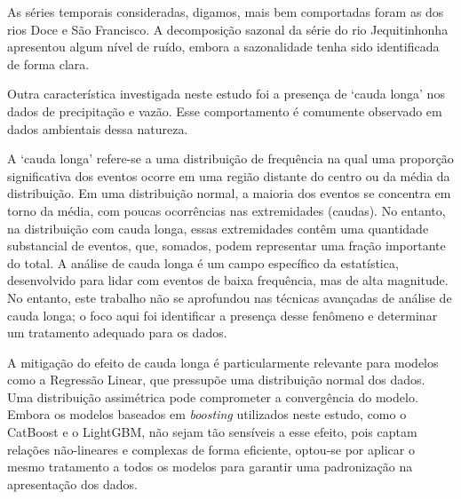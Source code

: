 As séries temporais consideradas, digamos, mais bem comportadas foram as dos rios Doce e São Francisco. A decomposição sazonal da série do rio Jequitinhonha apresentou algum nível de ruído, embora a sazonalidade tenha sido identificada de forma clara.

%

Outra característica investigada neste estudo foi a presença de `cauda longa' nos dados de precipitação e vazão. Esse comportamento é comumente observado em dados ambientais dessa natureza.\cite{elena_macdonald_2023}

A `cauda longa' refere-se a uma distribuição de frequência na qual uma proporção significativa dos eventos ocorre em uma região distante do centro ou da média da distribuição. Em uma distribuição normal, a maioria dos eventos se concentra em torno da média, com poucas ocorrências nas extremidades (caudas). No entanto, na distribuição com cauda longa, essas extremidades contêm uma quantidade substancial de eventos, que, somados, podem representar uma fração importante do total. A análise de cauda longa é um campo específico da estatística, desenvolvido para lidar com eventos de baixa frequência, mas de alta magnitude. No entanto, este trabalho não se aprofundou nas técnicas avançadas de análise de cauda longa; o foco aqui foi identificar a presença desse fenômeno e determinar um tratamento adequado para os dados.

A mitigação do efeito de cauda longa é particularmente relevante para modelos como a Regressão Linear, que pressupõe uma distribuição normal dos dados. Uma distribuição assimétrica pode comprometer a convergência do modelo. Embora os modelos baseados em \textit{boosting} utilizados neste estudo, como o CatBoost e o LightGBM, não sejam tão sensíveis a esse efeito, pois captam relações não-lineares e complexas de forma eficiente, optou-se por aplicar o mesmo tratamento a todos os modelos para garantir uma padronização na apresentação dos dados.

